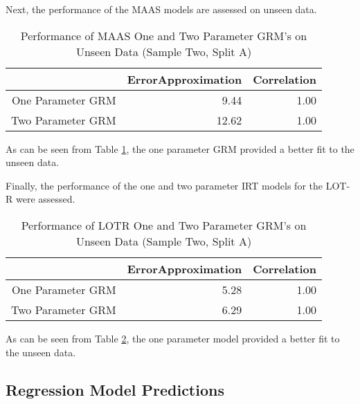 \documentclass{article}
\begin{document}
Next, the performance of the MAAS models are assessed on unseen data. 

\begin{table}[ht]
\centering
\begin{tabular}{rrr}
  \hline
 & ErrorApproximation & Correlation \\ 
  \hline
One Parameter GRM & 9.44 & 1.00 \\ 
  Two Parameter GRM & 12.62 & 1.00 \\ 
   \hline
\end{tabular}
\caption{Performance of MAAS One and Two Parameter GRM's on Unseen Data (Sample Two, Split A)} 
\label{tab:hom1maasgrmtest}
\end{table}
As can be seen from Table \ref{tab:hom1maasgrmtest}, the one parameter GRM provided a better fit to the unseen  data. 

Finally, the performance of the one and two parameter IRT models for the LOT-R were assessed. 

\begin{table}[ht]
\centering
\begin{tabular}{rrr}
  \hline
 & ErrorApproximation & Correlation \\ 
  \hline
One Parameter GRM & 5.28 & 1.00 \\ 
  Two Parameter GRM & 6.29 & 1.00 \\ 
   \hline
\end{tabular}
\caption{Performance of LOTR One and Two Parameter GRM's on Unseen Data (Sample Two, Split A)} 
\label{tab:hom1lotrgrmtest}
\end{table}

As can be seen from Table \ref{tab:hom1lotrgrmtest}, the one parameter model provided a better fit to the unseen data. 

\subsection{Regression Model Predictions}
\label{sec:regr-model-pred}
\end{document}
